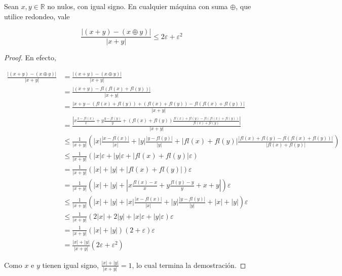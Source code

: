 \begin{propo}
Sean $x, y \in \mathbb{R}$ no nulos, con igual signo. En cualquier máquina con suma $\oplus$, que utilice redondeo, vale

\[\frac{|(x + y) - (x \oplus y)|}{|x + y|} \leq 2\varepsilon + \varepsilon^2\]

\begin{proof}
En efecto,

\begin{align*}
\frac{|(x + y) - (x \oplus y)|}{|x + y|} &= \frac{|(x + y) - (x \oplus y)|}{|x + y|}\\
&= \frac{|(x + y) - fl(fl(x) + fl(y))|}{|x + y|}\\
&= \frac{|x + y - (fl(x) + fl(y)) + (fl(x) + fl(y)) - fl(fl(x) + fl(y))|}{|x + y|}\\
&= \frac{\left|x\frac{x - fl(x)}{x} + y \frac{y - fl(y)}{y} + (fl(x) + fl(y)) \frac{fl(x) + fl(y) - fl(fl(x) + fl(y))}{fl(x) + fl(y)}\right|}{|x + y|}\\
&\leq \frac{1}{|x + y|} \left(|x| \frac{|x - fl(x)|}{|x|} + |y| \frac{|y - fl(y)|}{|y|} + |fl(x) + fl(y)| \frac{|fl(x) + fl(y) - fl(fl(x) + fl(y))|}{|fl(x) + fl(y)|}\right)\\
&\leq \frac{1}{|x + y|} \left(|x|\varepsilon + |y| \varepsilon + |fl(x) + fl(y)| \varepsilon \right)\\
&= \frac{1}{|x + y|}\left(|x| + |y| + |fl(x) + fl(y)| \right)\varepsilon\\
&= \frac{1}{|x + y|}\left(|x| + |y| + \left|x \frac{fl(x) - x}{x} + y \frac{fl(y) - y}{y} + x + y\right|\right)\varepsilon\\
&\leq \frac{1}{|x + y|}\left(|x| + |y| + |x|\frac{|x - fl(x)|}{|x|} + |y| \frac{|y - fl(y)|}{|y|} + |x| + |y|\right)\varepsilon\\
&\leq \frac{1}{|x + y|}\left(2|x| + 2|y| + |x|\varepsilon + |y|\varepsilon \right)\varepsilon\\
&=\frac{1}{|x + y|}(|x| + |y|)(2 + \varepsilon)\varepsilon\\
&=\frac{|x| + |y|}{|x + y|}(2\varepsilon + \varepsilon^2)
\end{align*}

Como $x$ e $y$ tienen igual signo, $\frac{|x| + |y|}{|x + y|} = 1$, lo cual termina la demostración.
\end{proof}
\end{propo}


